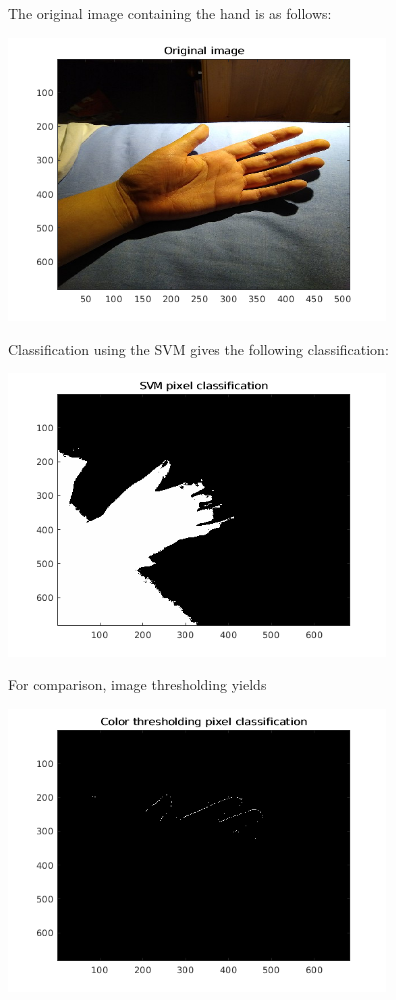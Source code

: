 \documentclass[letterpaper,12pt]{article}
\begin{document}
\begin{enumerate}
  The original image containing the hand is as follows:
  \begin{center}
    \includegraphics[width=10cm]{hand_orig.png}
  \end{center}
  Classification using the SVM gives the following classification:
  \begin{center}
    \includegraphics[width=10cm]{hand_svm.png}
  \end{center}
  For comparison, image thresholding yields
  \begin{center}
    \includegraphics[width=10cm]{hand_color_thresh.png}

\end{center}
\end{enumerate}
\end{document}
